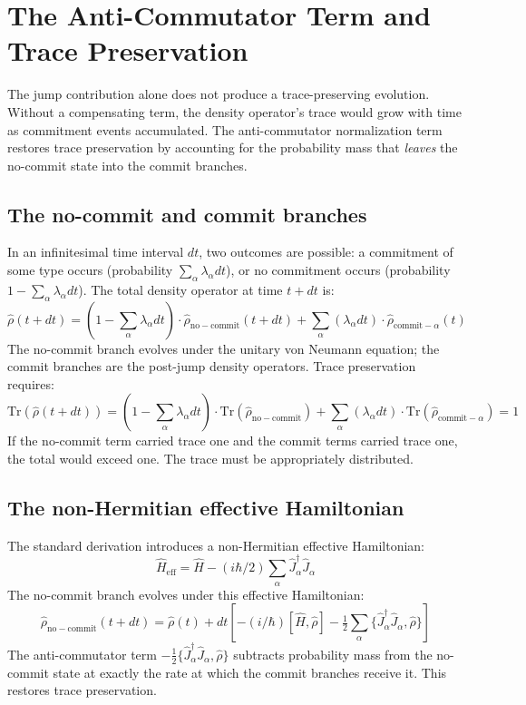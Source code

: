 \documentclass[11pt,a4paper]{article}
\begin{document}
\section{The Anti-Commutator Term and Trace Preservation}

The jump contribution alone does not produce a trace-preserving evolution. Without a compensating term, the density operator's trace would grow with time as commitment events accumulated. The anti-commutator normalization term restores trace preservation by accounting for the probability mass that \emph{leaves} the no-commit state into the commit branches.

\subsection{The no-commit and commit branches}

In an infinitesimal time interval $dt$, two outcomes are possible: a commitment of some type occurs (probability $\sum_\alpha \lambda_\alpha dt$), or no commitment occurs (probability $1 - \sum_\alpha \lambda_\alpha dt$). The total density operator at time $t + dt$ is:
\[
\hat\rho(t + dt) = (1 - \textstyle\sum_\alpha\lambda_\alpha dt)\cdot\hat\rho_{\mathrm{no-commit}}(t + dt) + \sum_\alpha(\lambda_\alpha dt)\cdot\hat\rho_{\mathrm{commit-}\alpha}(t)
\]
The no-commit branch evolves under the unitary von Neumann equation; the commit branches are the post-jump density operators. Trace preservation requires:
\[
\mathrm{Tr}(\hat\rho(t + dt)) = (1 - \textstyle\sum_\alpha\lambda_\alpha dt)\cdot\mathrm{Tr}(\hat\rho_{\mathrm{no-commit}}) + \sum_\alpha(\lambda_\alpha dt)\cdot\mathrm{Tr}(\hat\rho_{\mathrm{commit-}\alpha}) = 1
\]
If the no-commit term carried trace one and the commit terms carried trace one, the total would exceed one. The trace must be appropriately distributed.

\subsection{The non-Hermitian effective Hamiltonian}

The standard derivation introduces a non-Hermitian effective Hamiltonian:
\[
\hat H_{\mathrm{eff}} = \hat H - (i\hbar/2)\sum_\alpha \hat J_\alpha^\dagger \hat J_\alpha
\]
The no-commit branch evolves under this effective Hamiltonian:
\[
\hat\rho_{\mathrm{no-commit}}(t + dt) = \hat\rho(t) + dt\left[-(i/\hbar)[\hat H, \hat\rho] - \tfrac{1}{2}\sum_\alpha\{\hat J_\alpha^\dagger \hat J_\alpha, \hat\rho\}\right]
\]
The anti-commutator term $-\tfrac{1}{2}\{\hat J_\alpha^\dagger \hat J_\alpha, \hat\rho\}$ subtracts probability mass from the no-commit state at exactly the rate at which the commit branches receive it. This restores trace preservation.
\end{document}
